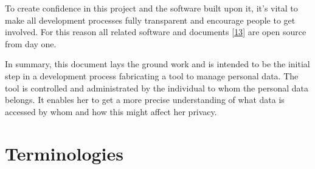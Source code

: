 \documentclass[12pt,english,a4paper,titlepage,cleardoublepage=empty,dottedtoc]{report}
\begin{document}
To create confidence in this project and the software built upon it,
it's vital to make all development processes fully transparent and
encourage people to get involved. For this reason all related software
and documents {[}\protect\hyperlink{ref-repo_2016_pdaas-spec}{13}{]} are
open source from day one.

In summary, this document lays the ground work and is intended to be the
initial step in a development process fabricating a tool to manage
personal data. The tool is controlled and administrated by the
individual to whom the personal data belongs. It enables her to get a
more precise understanding of what data is accessed by whom and how this
might affect her privacy.

\hypertarget{terminologies}{\section{Terminologies}\label{terminologies}}
\end{document}
